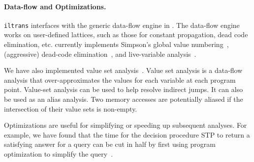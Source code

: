 \paragraph{Data-flow and Optimizations.} {\tt iltrans} interfaces with
the generic data-flow engine in \bap.  The data-flow engine works on
user-defined lattices, such as those for constant propagation, dead
code elimination, etc.  \bap currently implements
Simpson's global value numbering~\cite{simpson:1996}, (aggressive)
dead-code elimination~\cite{muchnick:1997}, and live-variable
analysis~\cite{muchnick:1997}.

We have also implemented value set
analysis~\cite{balakrishnan:2007}. Value set analysis is a data-flow
analysis that over-approximates the values for each variable at each
program point. Value-set analysis can be used to help resolve indirect
jumps. It can also be used as an alias analysis.  Two memory accesses
are potentially aliased if the intersection of their value sets is
non-empty.


Optimizations are useful for simplifying or speeding up subsequent
analyses. For example, we have found that the time for the decision
procedure STP to return a satisfying answer for a query can be cut in
half by first using program optimization to simplify the
query~\cite{brumley:2008}.






